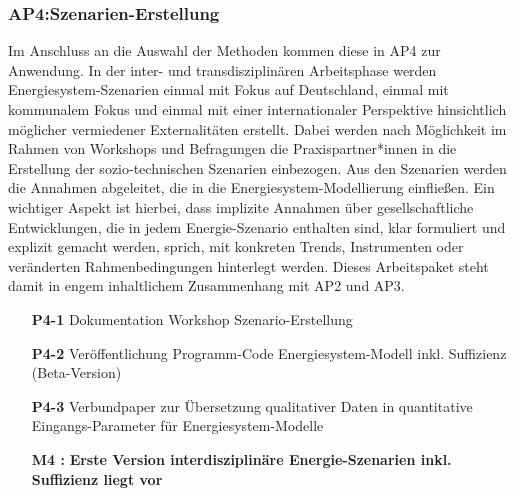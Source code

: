 \documentclass[a4paper,11pt,twoside]{scrartcl}
\begin{document}
\subsubsection*{AP4:Szenarien-Erstellung}
Im Anschluss an die Auswahl der Methoden kommen diese in AP4 zur Anwendung. In der inter- und transdisziplinären Arbeitsphase werden Energiesystem-Szenarien einmal mit Fokus auf Deutschland, einmal mit kommunalem Fokus und einmal mit einer internationaler Perspektive hinsichtlich möglicher vermiedener Externalitäten erstellt. Dabei werden nach Möglichkeit im Rahmen von Workshops und Befragungen die Praxispartner*innen in die Erstellung der sozio-technischen Szenarien einbezogen. Aus den Szenarien werden die Annahmen abgeleitet, die in die Energiesystem-Modellierung einfließen. Ein wichtiger Aspekt ist hierbei, dass implizite Annahmen über gesellschaftliche Entwicklungen, die in jedem Energie-Szenario enthalten sind, klar formuliert und explizit gemacht werden, sprich, mit konkreten Trends, Instrumenten oder veränderten Rahmenbedingungen hinterlegt werden. Dieses Arbeitspaket steht damit in engem inhaltlichem Zusammenhang mit AP2 und AP3.

\begin{itemize}
    \item[\textbf{P4-1}] Dokumentation Workshop Szenario-Erstellung
    \item[\textbf{P4-2}] Veröffentlichung Programm-Code Energiesystem-Modell inkl. Suffizienz (Beta-Version)
    \item[\textbf{P4-3}] Verbundpaper zur Übersetzung qualitativer Daten in quantitative Eingangs-Parameter für Energiesystem-Modelle
    \item[\textbf{M4 :}] \textbf{Erste Version interdisziplinäre Energie-Szenarien inkl. Suffizienz liegt vor}
\end{itemize}
\end{document}
